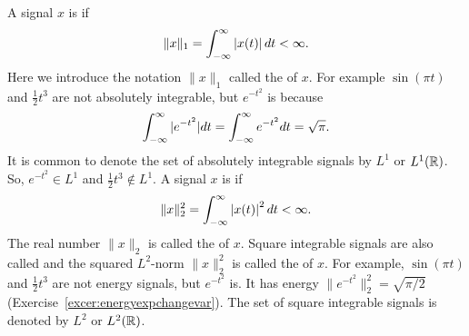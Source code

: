A signal $x$ is  if
\begin{equation}\label{eq:l1normdefncontinuous}
\|x\|_1 = \int_{-\infty}^{\infty} \left\vert x(t) \right\vert dt < \infty.
\end{equation}
Here we introduce the notation $\|x\|_1$ called the  of $x$.  For example $\sin( \pi t)$ and $\tfrac{1}{2}t^3$ are not absolutely integrable, but $e^{-t^2}$ is because~\citep{nicholas_1950_erf}
\begin{equation}\label{eq:expabssum}
\int_{-\infty}^{\infty} \vert e^{-t^2} \vert dt = \int_{-\infty}^{\infty} e^{-t^2} dt  = \sqrt{\pi}.
\end{equation}
It is common to denote the set of absolutely integrable signals by $L^1$ or $L^1({\mathbb R})$.  So, $e^{-t^2} \in L^1$ and $\tfrac{1}{2}t^3 \notin L^1$.   A signal $x$ is  if
\[
\|x\|_2^2 = \int_{-\infty}^{\infty} \left\vert x(t) \right\vert^2 dt < \infty.
\]
The real number $\|x\|_2$ is called the  of $x$.  Square integrable signals are also called  and the squared $L^2$-norm $\|x\|_2^2$ is called the  of $x$. For example, $\sin( \pi t)$ and $\tfrac{1}{2}t^3$ are not energy signals, but $e^{-t^2}$ is.  It has energy $\|e^{-t^2}\|_2^2 = \sqrt{\pi/2}$ (Exercise~\ref{excer:energyexpchangevar}). The set of square integrable signals is denoted by $L^2$ or $L^2({\mathbb R})$.  %
